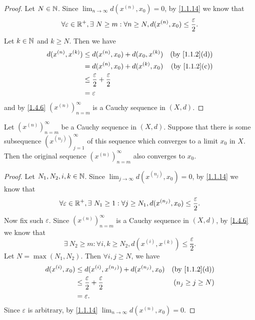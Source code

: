 \begin{proof}
  Let \(N \in \mathbb{N}\).
  Since \(\lim_{n \to \infty} d(x^{(n)}, x_0) = 0\), by \cref{1.1.14} we know that
  \[
    \forall \varepsilon \in \mathbb{R}^+, \exists\ N \geq m : \forall n \geq N, d(x^{(n)}, x_0) \leq \frac{\varepsilon}{2}.
  \]
  Let \(k \in \mathbb{N}\) and \(k \geq N\).
  Then we have
  \begin{align*}
    d(x^{(n)}, x^{(k)}) & \leq d(x^{(n)}, x_0) + d(x_0, x^{(k)})             & \text{(by \cref{1.1.2}(d))} \\
                        & = d(x^{(n)}, x_0) + d(x^{(k)}, x_0)                & \text{(by \cref{1.1.2}(c))} \\
                        & \leq \frac{\varepsilon}{2} + \frac{\varepsilon}{2}                               \\
                        & = \varepsilon
  \end{align*}
  and by \cref{1.4.6} \((x^{(n)})_{n = m}^\infty\) is a Cauchy sequence in \((X, d)\).
\end{proof}

\setcounter{thm}{8}
\begin{lem}\label{1.4.9}
  Let \((x^{(n)})_{n = m}^\infty\) be a Cauchy sequence in \((X, d)\).
  Suppose that there is some subsequence \((x^{(n_j)})_{j = 1}^\infty\) of this sequence which converges to a limit \(x_0\) in \(X\).
  Then the original sequence \((x^{(n)})_{n = m}^\infty\) also converges to \(x_0\).
\end{lem}

\begin{proof}
  Let \(N_1, N_2, i, k \in \mathbb{N}\).
  Since \(\lim_{j \to \infty} d(x^{(n_j)}, x_0) = 0\), by \cref{1.1.14} we know that
  \[
    \forall \varepsilon \in \mathbb{R}^+, \exists\ N_1 \geq 1 : \forall j \geq N_1, d(x^{(n_j)}, x_0) \leq \frac{\varepsilon}{2}.
  \]
  Now fix such \(\varepsilon\).
  Since \((x^{(n)})_{n = m}^\infty\) is a Cauchy sequence in \((X, d)\), by \cref{1.4.6} we know that
  \[
    \exists\ N_2 \geq m : \forall i, k \geq N_2, d(x^{(i)}, x^{(k)}) \leq \frac{\varepsilon}{2}.
  \]
  Let \(N = \max(N_1, N_2)\).
  Then \(\forall i, j \geq N\), we have
  \begin{align*}
    d(x^{(i)}, x_0) & \leq d(x^{(i)}, x^{(n_j)}) + d(x^{(n_j)}, x_0)     & \text{(by \cref{1.1.2}(d))} \\
                    & \leq \frac{\varepsilon}{2} + \frac{\varepsilon}{2} & (n_j \geq j \geq N)         \\
                    & = \varepsilon.
  \end{align*}
  Since \(\varepsilon\) is arbitrary, by \cref{1.1.14} \(\lim_{n \to \infty} d(x^{(n)}, x_0) = 0\).
\end{proof}

